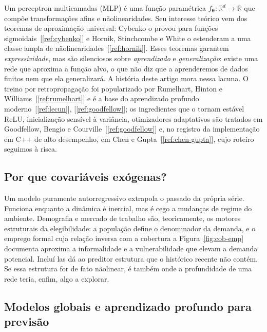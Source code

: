 \documentclass[12pt,a4paper,oneside]{article}
\newcommand{\C}[1]{[\ref{#1}]}
\begin{document}
Um perceptron multicamadas (MLP) é uma função paramétrica
$f_{\bm\theta}:\mathbb{R}^{d}\to\mathbb{R}$ que compõe transformações
afins e não\-linearidades. Seu interesse teórico vem dos teoremas de
aproximação universal: Cybenko o provou para funções
sigmoidais~\C{ref:cybenko} e Hornik, Stinchcombe e White o estenderam a
uma classe ampla de não\-linearidades~\C{ref:hornik}. Esses teoremas
garantem \emph{expressividade}, mas são silenciosos sobre
\emph{aprendizado} e \emph{generalização}: existe uma rede que aproxima a
função alvo, o que não diz que a aprenderemos de dados finitos nem que ela
generalizará. A história deste artigo mora nessa lacuna. O treino por
retropropagação foi popularizado por Rumelhart, Hinton e
Williams~\C{ref:rumelhart} e é a base do aprendizado profundo
moderno~\C{ref:lecun}, \C{ref:goodfellow}; os ingredientes que o tornam
estável \textemdash{} ReLU, inicialização sensível à variância,
otimizadores adaptativos \textemdash{} são tratados em
Goodfellow, Bengio e Courville~\C{ref:goodfellow} e, no registro da
implementação em C++ de alto desempenho, em Chen e
Gupta~\C{ref:chen-gupta}, cujo roteiro seguimos à risca.

\subsection{Por que covariáveis exógenas?}

Um modelo puramente autorregressivo extrapola o passado da própria série.
Funciona enquanto a dinâmica é inercial, mas é cego a mudanças de regime
do ambiente. Demografia e mercado de trabalho são, teoricamente, os
motores estruturais da elegibilidade: a população define o denominador da
demanda, e o emprego formal \textemdash{} cuja relação inversa com a
cobertura a Figura~\ref{fig:cob-emp} documenta \textemdash{} aproxima a
informalidade e a vulnerabilidade que elevam a demanda potencial. Incluí\-
las dá ao preditor estrutura que o histórico recente não contém. Se essa
estrutura for de fato não\-linear, é também onde a profundidade de uma
rede teria, enfim, algo a explorar.

\subsection{Modelos globais e aprendizado profundo para previsão}
\end{document}
